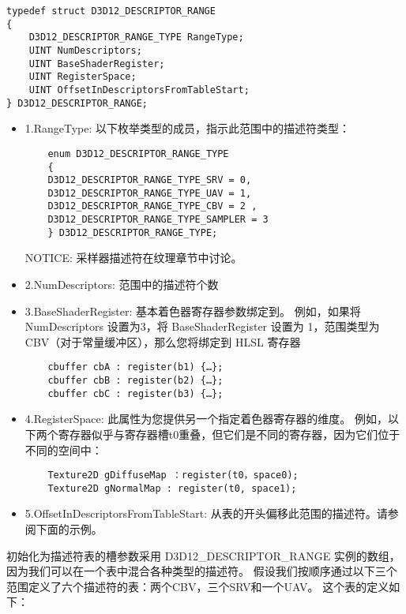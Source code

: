 \begin{lstlisting}
typedef struct D3D12_DESCRIPTOR_RANGE
{
    D3D12_DESCRIPTOR_RANGE_TYPE RangeType;
    UINT NumDescriptors;
    UINT BaseShaderRegister;
    UINT RegisterSpace;
    UINT OffsetInDescriptorsFromTableStart;
} D3D12_DESCRIPTOR_RANGE;
\end{lstlisting}

\begin{itemize}
  \item 1.RangeType: 以下枚举类型的成员，指示此范围中的描述符类型：\\
  \begin{lstlisting}
    enum D3D12_DESCRIPTOR_RANGE_TYPE
    {
    D3D12_DESCRIPTOR_RANGE_TYPE_SRV = 0,
    D3D12_DESCRIPTOR_RANGE_TYPE_UAV = 1,
    D3D12_DESCRIPTOR_RANGE_TYPE_CBV = 2 ,
    D3D12_DESCRIPTOR_RANGE_TYPE_SAMPLER = 3
    } D3D12_DESCRIPTOR_RANGE_TYPE;
  \end{lstlisting}
  NOTICE: 采样器描述符在纹理章节中讨论。
  \item 2.NumDescriptors: 范围中的描述符个数
  \item 3.BaseShaderRegister: 基本着色器寄存器参数绑定到。 例如，如果将 NumDescriptors 设置为3，将 BaseShaderRegister 设置为 1，范围类型为 CBV（对于常量缓冲区），那么您将绑定到 HLSL 寄存器\\
  \begin{lstlisting}
    cbuffer cbA : register(b1) {…};
    cbuffer cbB : register(b2) {…};
    cbuffer cbC : register(b3) {…};
  \end{lstlisting}
  \item 4.RegisterSpace: 此属性为您提供另一个指定着色器寄存器的维度。 例如，以下两个寄存器似乎与寄存器槽t0重叠，但它们是不同的寄存器，因为它们位于不同的空间中：\\
  \begin{lstlisting}
    Texture2D gDiffuseMap ：register(t0，space0);
    Texture2D gNormalMap : register(t0, space1);
  \end{lstlisting}
  \item 5.OffsetInDescriptorsFromTableStart: 从表的开头偏移此范围的描述符。请参阅下面的示例。
\end{itemize}

\begin{flushleft}
初始化为描述符表的槽参数采用 D3D12\_DESCRIPTOR\_RANGE 实例的数组，因为我们可以在一个表中混合各种类型的描述符。 假设我们按顺序通过以下三个范围定义了六个描述符的表：两个CBV，三个SRV和一个UAV。 这个表的定义如下：\\
\end{flushleft}

